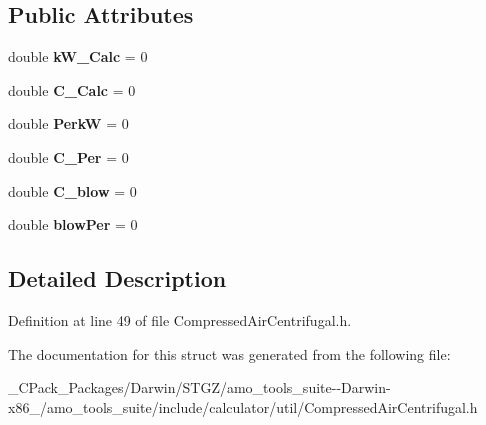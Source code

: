 \subsection*{Public Attributes}
\begin{DoxyCompactItemize}
\item 
\mbox{\label{struct_compressed_air_centrifugal_base_1_1_output_blow_off_aa0f6a04d746643866b5d7313e98d5238}} 
double {\bfseries k\+W\+\_\+\+Calc} = 0
\item 
\mbox{\label{struct_compressed_air_centrifugal_base_1_1_output_blow_off_a446bd99170a21cbe2e2f455ffb84fb3c}} 
double {\bfseries C\+\_\+\+Calc} = 0
\item 
\mbox{\label{struct_compressed_air_centrifugal_base_1_1_output_blow_off_ae32e799d5c24d5dd28ebed443767ec58}} 
double {\bfseries PerkW} = 0
\item 
\mbox{\label{struct_compressed_air_centrifugal_base_1_1_output_blow_off_ac1d9dbe029f7beb4ffbe80de8de64654}} 
double {\bfseries C\+\_\+\+Per} = 0
\item 
\mbox{\label{struct_compressed_air_centrifugal_base_1_1_output_blow_off_a49c031faabbe3d6afd3e30022317e825}} 
double {\bfseries C\+\_\+blow} = 0
\item 
\mbox{\label{struct_compressed_air_centrifugal_base_1_1_output_blow_off_a83596cabca680b4d7a013638853c02e5}} 
double {\bfseries blow\+Per} = 0
\end{DoxyCompactItemize}


\subsection{Detailed Description}


Definition at line 49 of file Compressed\+Air\+Centrifugal.\+h.



The documentation for this struct was generated from the following file\+:\begin{DoxyCompactItemize}
\item 
\+\_\+\+C\+Pack\+\_\+\+Packages/\+Darwin/\+S\+T\+G\+Z/amo\+\_\+tools\+\_\+suite-\/-\/\+Darwin-\/x86\+\_/amo\+\_\+tools\+\_\+suite/include/calculator/util/Compressed\+Air\+Centrifugal.\+h\end{DoxyCompactItemize}
